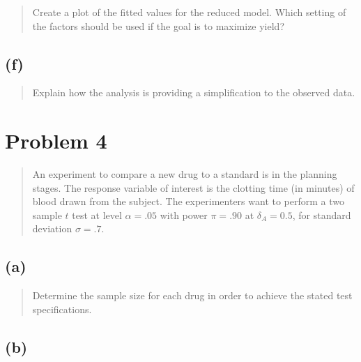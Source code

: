 \documentclass[
]{article}
\begin{document}
\begin{quote}
Create a plot of the fitted values for the reduced model. Which setting
of the factors should be used if the goal is to maximize yield?
\end{quote}

\vspace{50pt}

\hypertarget{f-2}{%
\subsection{(f)}\label{f-2}}

\begin{quote}
Explain how the analysis is providing a simplification to the observed
data.
\end{quote}

\vspace{50pt}

\hypertarget{problem-4}{%
\section{Problem 4}\label{problem-4}}

\begin{quote}
An experiment to compare a new drug to a standard is in the planning
stages. The response variable of interest is the clotting time (in
minutes) of blood drawn from the subject. The experimenters want to
perform a two sample \(t\) test at level \(\alpha = .05\) with power
\(\pi = .90\) at \(\delta_A = 0.5\), for standard deviation
\(\sigma = .7\).
\end{quote}

\vspace{50pt}

\hypertarget{a-3}{%
\subsection{(a)}\label{a-3}}

\begin{quote}
Determine the sample size for each drug in order to achieve the stated
test specifications.
\end{quote}

\vspace{50pt}

\hypertarget{b-3}{%
\subsection{(b)}\label{b-3}}
\end{document}
